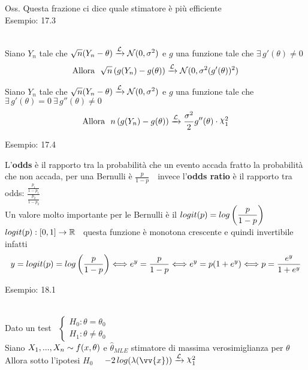 Oss. Questa frazione ci dice quale stimatore è più efficiente\\


Esempio: 17.3\\ \\


\begin{teo}
    Siano $Y_n$ tale che $\sqrt{n}(Y_n-\theta)\xrightarrow{\mathcal L}\mathcal N(0,\sigma^2)$ e  $g$ una funzione tale che $\exists\, g'(\theta)\ne 0$
    \[
    \text{Allora } \ \sqrt{n}\left( g(Y_n) - g(\theta) \right) \xrightarrow{\mathcal L} \mathcal N (0,\sigma^2(g'(\theta))^2)
    \]
\end{teo}

\begin{teo}
    Siano $Y_n$ tale che $\sqrt{n}(Y_n-\theta)\xrightarrow{\mathcal L}\mathcal N(0,\sigma^2)$ e  $g$ una funzione tale che $\exists\, g'(\theta) = 0 \ \exists \, g''(\theta)\ne 0$
    \[
    \text{Allora } \ n\O g(Y_n) - g(\theta) \C \xrightarrow{\Lc} \frac{\sigma^2}{2}g''(\theta)\cdot \Chi^2_1
    \]
\end{teo}
\phantom{}

Esempio: 17.4\\



\begin{defi}
    L'\textbf{odds} è il rapporto tra la probabilità che un evento accada fratto la probabilità che non accada, per una Bernulli è $\frac{p}{1-p}$\ \ invece l'\textbf{odds ratio} è il rapporto tra odds: $\frac{\tfrac{p_1}{1-p_1}}{\tfrac{p_2}{1-p_2}}$\skipp\\
    Un valore molto importante per le Bernulli è il $logit(p)=log\left(\dfrac{p}{1-p}\right)$\\
    $logit(p):[0,1]\to\mathbb R$ \ questa funzione è monotona crescente e quindi invertibile  infatti
    \[
    y=logit(p)=log\left(\dfrac{p}{1-p}\right) \Longleftrightarrow e^y=\dfrac{p}{1-p} \Longleftrightarrow e^y=p(1+e^y) \Longleftrightarrow p=\dfrac{e^y}{1+e^y}
    \]
\end{defi}


\phantom{}

Esempio: 18.1\\ \\

\begin{teo}
    Dato un test  \ $\begin{cases}
    H_0 : \theta=\theta_0\\
    H_1 : \theta \ne \theta_0
    \end{cases}$\\
    Siano $X_1,...,X_n \sim f(x,\theta)$ e $\hat{\theta}_{MLE}$ stimatore di massima verosimiglianza per $\theta$ \\
    Allora sotto l'ipotesi $H_0$ \ \ $-2\,log(\lambda(\vv{x}))\xrightarrow{\Lc}\Chi^2_1$
\end{teo}

